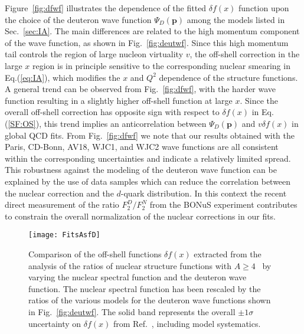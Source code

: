 \documentclass[%
      aps,
      prd,
      floatfix,
      preprintnumbers,
      preprint,
      showpacs,
      nofootinbib,
      tightenlines,
      amssymb,
      amsmath
]{revtex4-1}
\newcommand{\eq}[1]{Eq.(\ref{#1})}
\begin{document}
Figure~\ref{fig:dfwf} illustrates the dependence of the fitted $\delta f(x)$ function upon the 
choice of the deuteron wave function $\Psi_D(\bm p)$ among the models listed in Sec.~\ref{sec:IA}. 
The main differences are related to the high momentum component of the
wave function, as shown in Fig.~\ref{fig:deutwf}.
Since this high momentum tail controls the region of large nucleon virtuality $v$, 
the off-shell correction in the large $x$ region is in principle sensitive to the 
corresponding nuclear smearing in \eq{eq:IA}, which modifies the $x$ and $Q^2$ 
dependence of the structure functions.  
A general trend can be observed from Fig.~\ref{fig:dfwf}, with the harder 
wave function resulting in a slightly higher off-shell function at large $x$. 
Since the overall off-shell correction has opposite sign with respect to $\delta f(x)$ 
in \eq{SF:OS}, this trend implies an anticorrelation between $\Psi_D(\bm p)$ 
and $v\delta f(x)$ in global QCD fits.   
From Fig.~\ref{fig:dfwf} we note that our results obtained with the Paris, CD-Bonn, 
AV18, WJC1, and WJC2 wave functions are all consistent within the corresponding uncertainties 
and indicate a relatively limited spread. This robustness against the  modeling 
of the deuteron wave function can be explained by the use of data samples which can 
reduce the correlation between the nuclear correction and the $d$-quark distribution. 
In this context the recent direct measurement of the ratio $F_2^D/F_2^N$ from the 
BONuS experiment contributes to constrain the overall normalization 
of the nuclear corrections in our fits. 


\begin{figure}[htb] %
\begin{center}
\texttt{[image: FitsAsfD]}
\caption{%
Comparison of the off-shell functions $\delta f(x)$ 
extracted from the analysis of the ratios of nuclear structure functions with $A \geq 4$~\cite{KP04} by
varying the nuclear spectral function and the deuteron wave function. The nuclear spectral function 
has been rescaled by the ratios of the various models for the deuteron wave functions shown 
in Fig.~\ref{fig:deutwf}. 
The solid band represents the overall $\pm 1 \sigma$ uncertainty 
on $\delta f(x)$ from Ref.~\cite{KP04}, including model systematics. 
}
\label{fig:dfsf}
\end{center}
\end{figure}
\end{document}
